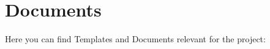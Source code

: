 \chapter{Documents}


 Here you can find Templates and  Documents relevant for the project:


\newpage



